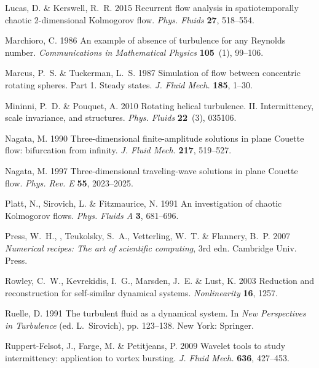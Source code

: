 \documentclass{article}
\begin{document}
\begin{thebibliography}{68}
{\sc Lucas, D. \& Kerswell, R.~R.} 2015 Recurrent flow analysis in
  spatiotemporally chaotic 2-dimensional {Kolmogorov} flow. {\em Phys.
  Fluids\/} {\bf 27}, 518--554.

{\sc Marchioro, C.} 1986 An example of absence of turbulence for any {R}eynolds
  number. {\em Communications in Mathematical Physics\/} {\bf 105}~(1),
  99--106.

{\sc Marcus, P.~S. \& Tuckerman, L.~S.} 1987 Simulation of flow between
  concentric rotating spheres. {P}art 1. {S}teady states. {\em J. Fluid
  Mech.\/} {\bf 185}, 1--30.

{\sc Mininni, P.~D. \& Pouquet, A.} 2010 Rotating helical turbulence. {II}.
  {I}ntermittency, scale invariance, and structures. {\em Phys. Fluids\/} {\bf
  22}~(3), 035106.

{\sc Nagata, M.} 1990 Three-dimensional finite-amplitude solutions in plane
  {C}ouette flow: bifurcation from infinity. {\em J. Fluid Mech.\/} {\bf 217},
  519--527.

{\sc Nagata, M.} 1997 Three-dimensional traveling-wave solutions in plane
  {C}ouette flow. {\em Phys. Rev. E\/} {\bf 55}, 2023--2025.

{\sc Platt, N., Sirovich, L. \& Fitzmaurice, N.} 1991 An investigation of
  chaotic {Kolmogorov} flows. {\em Phys. Fluids A\/} {\bf 3}, 681--696.

{\sc Press, W.~H., , Teukolsky, S.~A., Vetterling, W.~T. \& Flannery, B.~P.}
  2007 {\em Numerical recipes: {T}he art of scientific computing\/}, 3rd edn.
  Cambridge Univ. Press.

{\sc Rowley, C.~W., Kevrekidis, I.~G., Marsden, J.~E. \& Lust, K.} 2003
  Reduction and reconstruction for self-similar dynamical systems. {\em
  Nonlinearity\/} {\bf 16}, 1257.

{\sc Ruelle, D.} 1991 The turbulent fluid as a dynamical system. In {\em New
  Perspectives in Turbulence\/} (ed. L.~Sirovich), pp. 123--138. New York:
  Springer.

{\sc Ruppert-Felsot, J., Farge, M. \& Petitjeans, P.} 2009 Wavelet tools to
  study intermittency: application to vortex bursting. {\em J. Fluid Mech.\/}
  {\bf 636}, 427--453.


\end{thebibliography}
\end{document}
